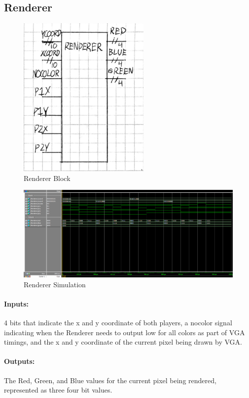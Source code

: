 \documentclass[]{article}
\begin{document}
\subsection{Renderer}
\begin{figure}[H]\centering
    \includegraphics[width=0.5\linewidth]{figures/Renderer_Block.png}
    \caption{Renderer Block}
    \label{fig:rendererBlock}
\end{figure}
\begin{figure}[H]\centering
    \includegraphics[width=\linewidth]{figures/Renderer_Sim.png}
    \caption{Renderer Simulation}
    \label{fig:rendererSim}
\end{figure}
\paragraph{Inputs:} 4 bits that indicate the x and y coordinate of both players, a nocolor signal indicating when the Renderer needs to output low for all colors as part of VGA timings,
and the x and y coordinate of the current pixel being drawn by VGA.
\paragraph{Outputs:} The Red, Green, and Blue values for the current pixel being rendered, represented as three four bit values. 
\end{document}
